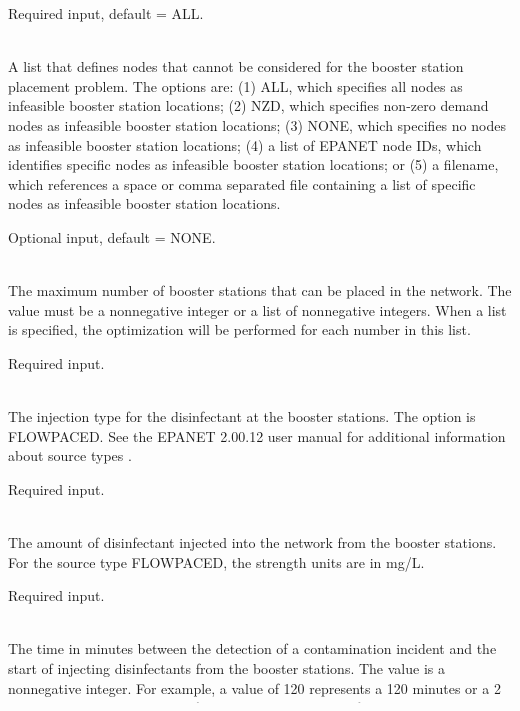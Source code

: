 \begin{description}[topsep=0pt,parsep=0.5em,itemsep=-0.4em]
\begin{description}[topsep=0pt,parsep=0.5em,itemsep=-0.4em]
                Required input, default = ALL.
    \item[{infeasible nodes}]\hfill
\\A list that defines nodes that cannot be considered for the booster station placement problem.
                The options are: (1) ALL, which specifies all nodes as infeasible booster station locations;
                (2) NZD, which specifies non-zero demand nodes as infeasible booster station locations;
                (3) NONE, which specifies no nodes as infeasible booster station locations;
                (4) a list of EPANET node IDs, which identifies specific nodes as infeasible booster station locations; or
                (5) a filename, which references a space or comma separated file containing a list of 
                specific nodes as infeasible booster station locations. 
                
                Optional input, default = NONE.
    \item[{max boosters}]\hfill
\\The maximum number of booster stations that can be placed in the
                network. The value must be a nonnegative integer or a list of
                nonnegative integers. When a list is specified, the optimization
                will be performed for each number in this list.
                
                Required input.
    \item[{type}]\hfill
\\The injection type for the disinfectant at the booster stations. The option is FLOWPACED. 
                See the EPANET 2.00.12 user manual for additional information about source types \cite{EPANETusermanual}.
                
                Required input.
    \item[{strength}]\hfill
\\The amount of disinfectant injected into the network from the booster stations. 
                For the source type FLOWPACED, the strength units are in mg/L.
            
                Required input.
    \item[{response time}]\hfill
\\The time in minutes between the detection of a contamination incident and 
                the start of injecting disinfectants from the booster stations. The value 
                is a nonnegative integer. For example, a value of 120 represents 
                a 120 minutes or a 2 hour delay between the time of detection and 
                the start of booster injections.
                

\end{description}
\end{description}
